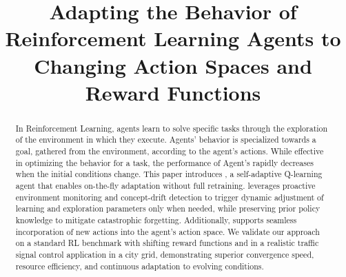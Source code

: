 \documentclass[10pt, conference, ]{IEEEtran}
\begin{document}
\title{Adapting the Behavior of Reinforcement Learning Agents to Changing Action Spaces and Reward Functions}

\author{
}

\maketitle




\begin{abstract}
In Reinforcement Learning, agents learn to solve specific tasks through the 
exploration of the environment in which they execute. Agents' behavior is
specialized towards a goal, gathered from the environment, according to the 
agent's actions. While effective in optimizing the behavior for a task, the 
performance of Agent's rapidly decreases when the initial conditions change.
This paper introduces \adaptiverl, a self-adaptive Q-learning agent that enables on-the-fly adaptation without full retraining. \adaptiverl leverages proactive environment monitoring and concept-drift detection to trigger dynamic adjustment of learning and exploration parameters only when needed, while preserving prior policy knowledge to mitigate catastrophic forgetting. Additionally, \adaptiverl supports seamless incorporation of new actions into the agent’s action space. We validate our approach on a standard RL benchmark with shifting reward functions and in a realistic traffic signal control application in a city grid, demonstrating superior convergence speed, resource efficiency, and continuous adaptation to evolving conditions.
\end{abstract}
\end{document}

